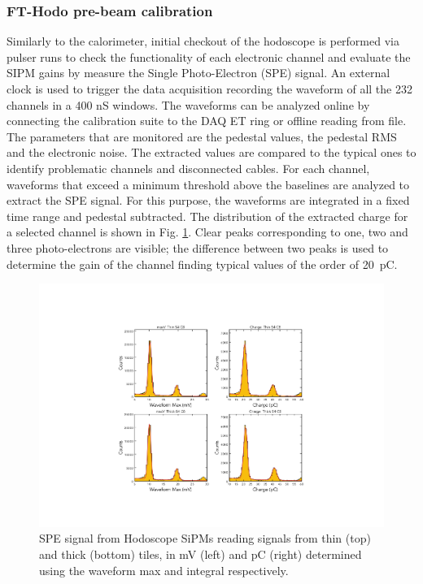 \subsubsection{FT-Hodo pre-beam calibration}
Similarly to the calorimeter, initial checkout of the hodoscope is performed via pulser runs to check the functionality of each electronic channel and evaluate the SIPM gains by measure the Single Photo-Electron (SPE) signal. An external clock is used to trigger the data acquisition recording the waveform of all the 232 channels in a 400 nS windows. The waveforms can be analyzed online by connecting the calibration suite to the DAQ ET ring or offline reading from file. The parameters that are monitored are the pedestal values, the pedestal RMS and the electronic noise. The extracted values are compared to the typical ones to identify problematic channels and disconnected cables. For each channel, waveforms that exceed a minimum threshold above the baselines are analyzed to extract the SPE signal. For this purpose, the waveforms are integrated in a fixed time range and pedestal subtracted. The distribution of the extracted charge for a selected channel is shown in Fig. \ref{fig:fthodo_spe}. Clear peaks corresponding to one, two and three photo-electrons are visible; the difference between two peaks is used to determine the gain of the channel finding typical values of the order of 20~pC.
\begin{figure}
\includegraphics[width=1.0\columnwidth]{fig/fthodo_spe_2.pdf}
\caption{SPE signal from Hodoscope SiPMs reading signals from thin (top) and thick (bottom) tiles, in mV (left) and pC (right) determined using the waveform max and integral respectively.   }
\label{fig:fthodo_spe}
\end{figure}

